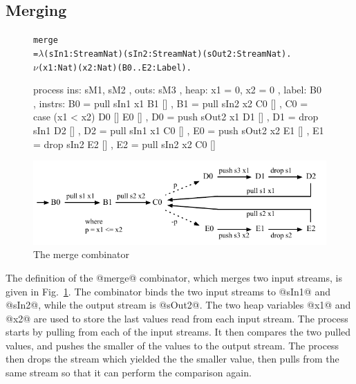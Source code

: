 \subsection{Merging}
\begin{figure}
\begin{alltt}
               merge
                 = \(\lambda\) (sIn1: Stream Nat) (sIn2: Stream Nat) (sOut2: Stream Nat). 
                   \(\nu\) (x1: Nat) (x2: Nat) (B0..E2: Label).
\end{alltt}
\begin{code}
                   process
                   { ins:    { sM1, sM2 }
                   , outs:   { sM3 }
                   , heap:   { x1 = 0, x2 = 0 }
                   , label:  B0
                   , instrs: { B0 = pull sIn1  x1   B1 []
                             , B1 = pull sIn2  x2   C0 []
                             , C0 = case (x1 < x2)  D0 []  E0 []
                             , D0 = push sOut2 x1   D1 []
                             , D1 = drop sIn1       D2 []
                             , D2 = pull sIn1  x1   C0 []
                             , E0 = push sOut2 x2   E1 []
                             , E1 = drop sIn2       E2 []
                             , E2 = pull sIn2 x2    C0 [] } }
\end{code}

\medskip
\includegraphics[scale=1.1]{figures/state-merge.pdf}
\caption{The merge combinator}
\label{fig:Process:Merge}
\end{figure}

The definition of the @merge@ combinator, which merges two input streams, is given in Fig.~\ref{fig:Process:Merge}. The combinator binds the two input streams to @sIn1@ and @sIn2@, while the output stream is @sOut2@. The two heap variables @x1@ and @x2@ are used to store the last values read from each input stream. The process starts by pulling from each of the input streams. It then compares the two pulled values, and pushes the smaller of the values to the output stream. The process then drops the stream which yielded the the smaller value, then pulls from the same stream so that it can perform the comparison again.

